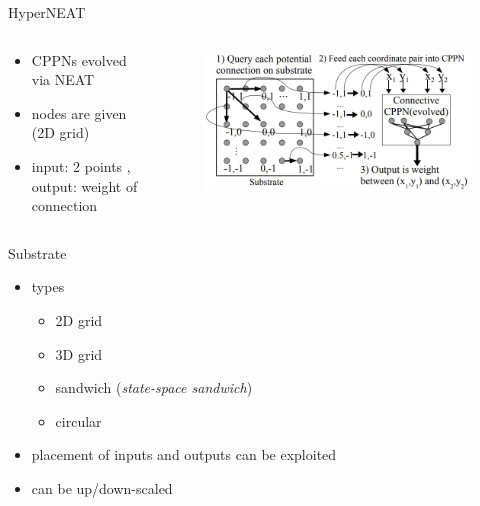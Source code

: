 \documentclass{beamer}
\begin{document}
\begin{frame}{HyperNEAT}
    \begin{columns}
        \begin{column}{0.5\textwidth}
            \begin{itemize}
                \item CPPNs evolved via NEAT
                \item nodes are given (2D grid)
                \item input: 2 points , output: weight of connection
            \end{itemize}
        \end{column}
        \begin{column}{0.5\textwidth}
            \begin{figure}[c]
                \includegraphics[width=\textwidth]{img/HyperNEAT.png}
            \end{figure}
        \end{column}
    \end{columns}
\end{frame}
\begin{frame}{Substrate}
    \begin{itemize}
        \item types
              \begin{itemize}
                  \item 2D grid
                  \item 3D grid
                  \item sandwich (\emph{state-space sandwich})
                  \item circular
              \end{itemize}
        \item placement of inputs and outputs can be exploited
        \item can be up/down-scaled
    \end{itemize}



\end{frame}
\end{document}
